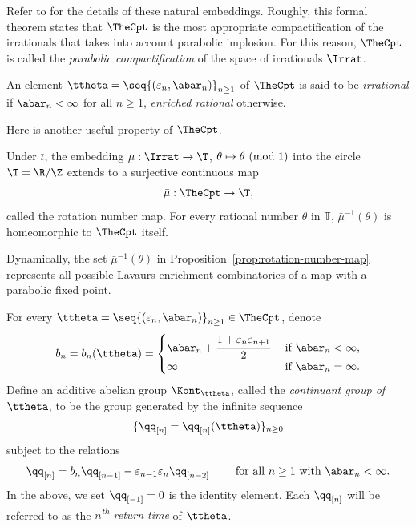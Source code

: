 \documentclass{amsart}
\begin{document}
Refer to \cite[Theorem B]{Lim26a} for the details of these natural embeddings.
Roughly, this formal theorem states that $\TheCpt$ is the most appropriate compactification of the irrationals that takes into account parabolic implosion.
For this reason, $\TheCpt$ is called the \emph{parabolic compactification} of the space of irrationals $\Irrat$.

\begin{definition}
    An element $\ttheta = \seq{ (\varepsilon_n, \abar_n) }_{n\geq 1}$ of $\TheCpt$ is said to be \emph{irrational} if $\abar_n < \infty$ for all $n \geq 1$, \emph{enriched rational} otherwise.
\end{definition}

Here is another useful property of $\TheCpt$.

\begin{proposition}
\label{prop:rotation-number-map}
    Under $\bar{\iota}$, the embedding $\mu: \Irrat \to \T$, $ \theta \mapsto \theta \textnormal{ (mod } 1)$ into the circle $\T=\R/\Z$ extends to a surjective continuous map
\[
    \bar{\mu} : \TheCpt \to \T,
\]
    called the rotation number map.
    For every rational number $\theta$ in $\mathbb{T}$, $\bar{\mu}^{-1}(\theta)$ is homeomorphic to $\TheCpt$ itself.
\end{proposition}

Dynamically, the set $\bar{\mu}^{-1}(\theta)$ in Proposition~\ref{prop:rotation-number-map} represents all possible Lavaurs enrichment combinatorics of a map with a parabolic fixed point.

\begin{definition}
\label{def:time-group}
For every $\ttheta = \seq{ (\varepsilon_n, \abar_n) }_{n \geq 1} \in \TheCpt$, denote
\[
    b_n = b_n(\ttheta) = 
    \begin{cases}
        \abar_n + \cfrac{1+ \varepsilon_n \varepsilon_{n+1}}{2} & \text{ if } \abar_n < \infty, \\
        \infty & \text{ if } \abar_n = \infty.
    \end{cases}
\]
Define an additive abelian group $\Kont_{\ttheta}$, called the \emph{continuant group of $\ttheta$}, to be the group generated by the infinite sequence 
\[
\{\qq_{[n]} = \qq_{[n]}(\ttheta)\}_{n \geq 0}
\]
subject to the relations
\[
    \qq_{[n]} = b_n \qq_{[n-1]} - \varepsilon_{n-1} \varepsilon_n  \qq_{[n-2]} \qquad \text{ for all } n \geq 1 \text{ with } \abar_n < \infty.
\]
In the above, we set $\qq_{[-1]} = 0$ is the identity element.
Each $\qq_{[n]}$ will be referred to as the \emph{$n$\textsuperscript{th} return time} of $\ttheta$.
\end{definition}
\end{document}
